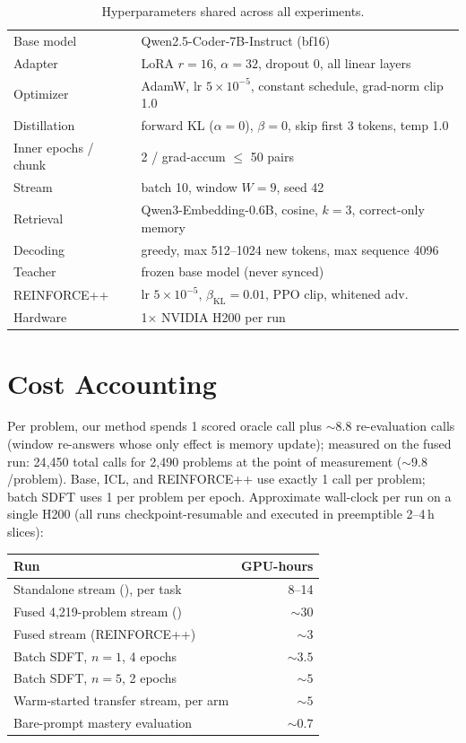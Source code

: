 \begin{table}[h]
\centering
\small
\begin{tabular}{ll}
\toprule
Base model & Qwen2.5-Coder-7B-Instruct (bf16) \\
Adapter & LoRA $r{=}16$, $\alpha{=}32$, dropout 0, all linear layers \\
Optimizer & AdamW, lr $5{\times}10^{-5}$, constant schedule, grad-norm clip 1.0 \\
Distillation & forward KL ($\alpha{=}0$), $\beta{=}0$, skip first 3 tokens, temp 1.0 \\
Inner epochs / chunk & 2 / grad-accum $\le$ 50 pairs \\
Stream & batch 10, window $W{=}9$, seed 42 \\
Retrieval & Qwen3-Embedding-0.6B, cosine, $k{=}3$, correct-only memory \\
Decoding & greedy, max 512--1024 new tokens, max sequence 4096 \\
Teacher & frozen base model (never synced) \\
REINFORCE++ & lr $5{\times}10^{-5}$, $\beta_{\mathrm{KL}}{=}0.01$, PPO clip, whitened adv. \\
Hardware & 1$\times$ NVIDIA H200 per run \\
\bottomrule
\end{tabular}
\caption{Hyperparameters shared across all experiments.}
\label{tab:hparams}
\end{table}

\section{Cost Accounting}
\label{app:cost}
Per problem, our method spends 1 scored oracle call plus ${\sim}8.8$
re-evaluation calls (window re-answers whose only effect is memory update);
measured on the fused run: 24{,}450 total calls for 2{,}490 problems at the
point of measurement (${\sim}9.8$/problem). Base, ICL, and REINFORCE++ use
exactly 1 call per problem; batch SDFT uses 1 per problem per epoch. Approximate wall-clock per run on a single H200 (all runs
checkpoint-resumable and executed in preemptible 2--4\,h slices):

\begin{center}
\small
\begin{tabular}{lr}
\toprule
Run & GPU-hours \\
\midrule
Standalone stream (\method{}), per task & 8--14 \\
Fused 4{,}219-problem stream (\method{}) & ${\sim}30$ \\
Fused stream (REINFORCE++) & ${\sim}3$ \\
Batch SDFT, $n{=}1$, 4 epochs & ${\sim}3.5$ \\
Batch SDFT, $n{=}5$, 2 epochs & ${\sim}5$ \\
Warm-started transfer stream, per arm & ${\sim}5$ \\
Bare-prompt mastery evaluation & ${\sim}0.7$ \\
\bottomrule
\end{tabular}
\end{center}

